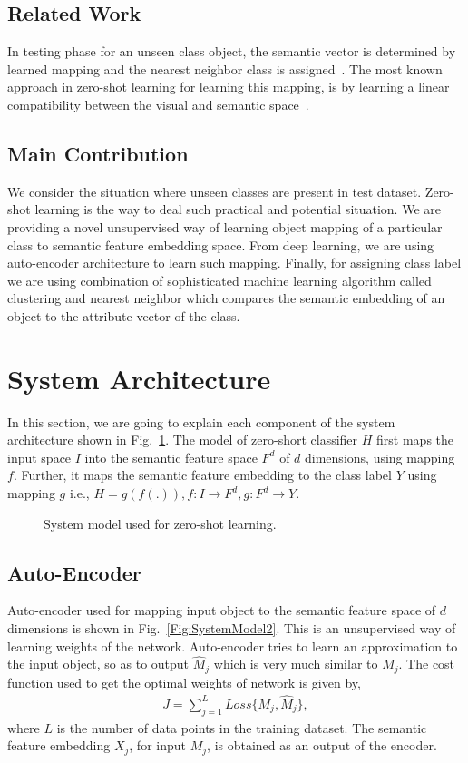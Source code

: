 \documentclass[11pt, conference, english]{IEEEtran}
\theoremstyle{plain}
\theoremstyle{definition}
\theoremstyle{remark}
\newcommand{\eq}[1]{\begin{align*}#1\end{align*}}
\begin{document}
	\subsection{Related Work}
	In testing phase for an unseen class
	object,  the semantic vector is determined by learned mapping and the nearest
	neighbor class is assigned~\cite{wang2016relational,socher2013zero}. The most known
	approach in zero-shot learning for learning this mapping, is by learning a linear compatibility between the visual and semantic space~\cite{frome2013devise}.
	\subsection{Main Contribution}
	We consider the situation where unseen classes are present in test dataset. Zero-shot learning is the way to deal such practical and potential situation. We are providing a novel unsupervised way of learning object mapping of a particular class to semantic feature embedding space. From deep learning, we are using auto-encoder architecture to learn such mapping. Finally, for assigning class label we are using combination of sophisticated machine learning algorithm called clustering and nearest neighbor which compares the semantic embedding of an object to the attribute vector of the class. 
	\section{System Architecture}
	In this section, we are going to explain each component of the system architecture shown in Fig.~\ref{Fig:SystemModel}. The model of zero-short classifier $H$ first maps the input space $I$ into the semantic feature space $F^d$ of $d$ dimensions, using mapping $f$. Further, it  maps  the semantic feature embedding to the class label $Y$ using mapping $g$ i.e.,
	$H=g(f(.)),
		f: I \rightarrow F^d,
		g: F^d \rightarrow Y.$
	\begin{figure}[h!]
		\centering
		\scalebox{.5}{}
		\caption{System model used for zero-shot learning.}
		\label{Fig:SystemModel}
	\end{figure}
	\subsection{Auto-Encoder}
	Auto-encoder used for mapping input object to the semantic feature space of $d$ dimensions is shown in Fig.~\ref{Fig:SystemModel2}. This is an unsupervised way of learning weights of the network. Auto-encoder tries to learn an approximation to the input object, so as to output $\hat{M}_j$ which is very much similar to $M_j$.  The cost function used to get the optimal weights of network is given by,  \eq{J=\sum\limits_{j=1}^{L} Loss\{M_j,\hat{M}_j\},} 
	where $L$ is the number of data points in the training dataset. The semantic feature embedding $X_j$, for input $M_j$, is obtained as an output of the encoder.
	
\end{document}
